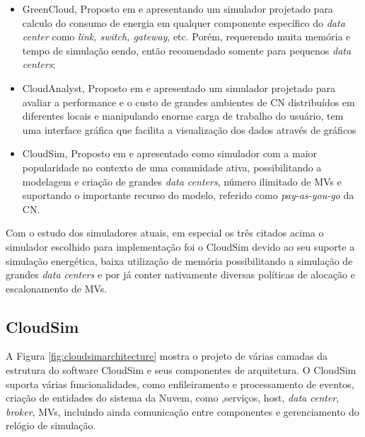 \documentclass[tcc,capa]{texufpel}
\begin{document}
\begin{itemize}
    \item GreenCloud, Proposto em \cite{greencloud} e apresentando um simulador projetado para calculo do consumo de energia em qualquer componente específico do \textit{data center} como \emph{link, switch, gateway}, etc. Porém, requerendo muita memória e  tempo de simulação sendo, então recomendado somente para pequenos \textit{data centers};
    
    \item CloudAnalyst, Proposto em \cite{cloudanalyst} e apresentado um simulador projetado para avaliar a performance e o custo de grandes ambientes de CN distribuídos em diferentes locais e manipulando enorme carga de trabalho do usuário, tem uma interface gráfica que facilita a visualização dos dados através de gráficos
    
    \item CloudSim, Proposto em \cite{calheiros2011cloudsim} e apresentado como simulador com a maior popularidade no contexto de uma comunidade ativa, possibilitando a modelagem e criação de grandes \textit{data centers}, número ilimitado de MVs e suportando o importante recurso do modelo, referido como \emph{pay-as-you-go} da CN.
\end{itemize}

Com o estudo dos simuladores atuais, em especial os três citados acima o simulador escolhido para implementação foi o CloudSim \cite{calheiros2011cloudsim} devido ao seu suporte a simulação energética, baixa utilização de memória possibilitando a simulação de grandes \textit{data centers} e por já conter nativamente diversas políticas de alocação e escalonamento de MVs.


\subsection{CloudSim}
A Figura \ref{fig:cloudsimarchitecture} mostra o projeto de várias camadas da estrutura do software CloudSim e seus componentes de arquitetura. O CloudSim suporta várias funcionalidades, como enfileiramento e processamento de eventos, criação de entidades do sistema da Nuvem, como ,serviços, host, \textit{data center}, \textit{broker}, MVs, incluindo ainda comunicação entre componentes e gerenciamento do relógio de simulação.
\end{document}
